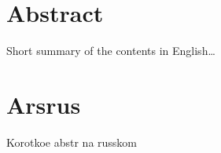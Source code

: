 \begingroup
\let\clearpage\relax
\let\cleardoublepage\relax
\let\cleardoublepage\relax

\chapter*{Abstract}
Short summary of the contents in English\dots


\vfill

\chapter*{Arsrus}
Korotkoe abstr na russkom


\endgroup			

\vfill
